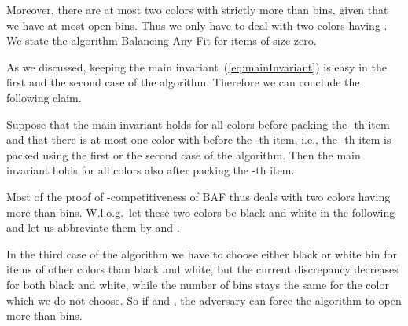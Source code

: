 \documentclass[11pt,a4paper]{article}
\begin{document}
Moreover, there are at most two colors with strictly more than  bins, given that we have at most  open
bins. Thus we only have to deal with two colors having . We state the algorithm Balancing Any Fit for items of
size zero.

\begin{center}
\end{center}

As we discussed, keeping the main
invariant~(\ref{eq:mainInvariant}) is easy in the first and the second
case of the algorithm. Therefore we can conclude the following claim.

\begin{claim} \label{clm:OptAlgMainInvar}
Suppose that the main invariant holds for all colors before packing the -th item
and that there is at most one color  with  before the -th item,
i.e., the -th item is packed using the first or the second
case of the algorithm. Then the main invariant holds for all colors also after packing the -th item.
\end{claim}

Most of the proof of -competitiveness of BAF thus deals with two colors having
more than  bins. W.l.o.g.\ let
these two colors be black and white in the following and let us abbreviate them by
 and .

In the third case of the algorithm we have to choose either black or
white bin for items of other colors than black and white, but the
current discrepancy decreases for both black and white, while the
number of bins stays the same for the color which we do not choose.
So if  and
, the adversary can
force the algorithm to open more than  bins.
\end{document}

